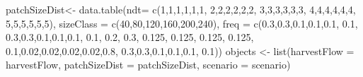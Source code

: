 \documentclass[
]{article}
\newenvironment{Shaded}{\begin{snugshade}}{\end{snugshade}}
\newcommand{\AttributeTok}[1]{\textcolor[rgb]{0.77,0.63,0.00}{#1}}
\newcommand{\DecValTok}[1]{\textcolor[rgb]{0.00,0.00,0.81}{#1}}
\newcommand{\FloatTok}[1]{\textcolor[rgb]{0.00,0.00,0.81}{#1}}
\newcommand{\FunctionTok}[1]{\textcolor[rgb]{0.00,0.00,0.00}{#1}}
\newcommand{\NormalTok}[1]{#1}
\newcommand{\OtherTok}[1]{\textcolor[rgb]{0.56,0.35,0.01}{#1}}
\begin{document}
\begin{Shaded}
\begin{Highlighting}[]
\NormalTok{patchSizeDist}\OtherTok{\textless{}{-}} \FunctionTok{data.table}\NormalTok{(}\AttributeTok{ndt=} \FunctionTok{c}\NormalTok{(}\DecValTok{1}\NormalTok{,}\DecValTok{1}\NormalTok{,}\DecValTok{1}\NormalTok{,}\DecValTok{1}\NormalTok{,}\DecValTok{1}\NormalTok{,}\DecValTok{1}\NormalTok{,}
                                  \DecValTok{2}\NormalTok{,}\DecValTok{2}\NormalTok{,}\DecValTok{2}\NormalTok{,}\DecValTok{2}\NormalTok{,}\DecValTok{2}\NormalTok{,}\DecValTok{2}\NormalTok{,}
                                  \DecValTok{3}\NormalTok{,}\DecValTok{3}\NormalTok{,}\DecValTok{3}\NormalTok{,}\DecValTok{3}\NormalTok{,}\DecValTok{3}\NormalTok{,}\DecValTok{3}\NormalTok{,}
                                  \DecValTok{4}\NormalTok{,}\DecValTok{4}\NormalTok{,}\DecValTok{4}\NormalTok{,}\DecValTok{4}\NormalTok{,}\DecValTok{4}\NormalTok{,}\DecValTok{4}\NormalTok{,}
                                  \DecValTok{5}\NormalTok{,}\DecValTok{5}\NormalTok{,}\DecValTok{5}\NormalTok{,}\DecValTok{5}\NormalTok{,}\DecValTok{5}\NormalTok{,}\DecValTok{5}\NormalTok{), }
                           \AttributeTok{sizeClass =} \FunctionTok{c}\NormalTok{(}\DecValTok{40}\NormalTok{,}\DecValTok{80}\NormalTok{,}\DecValTok{120}\NormalTok{,}\DecValTok{160}\NormalTok{,}\DecValTok{200}\NormalTok{,}\DecValTok{240}\NormalTok{), }
                           \AttributeTok{freq =} \FunctionTok{c}\NormalTok{(}\FloatTok{0.3}\NormalTok{,}\FloatTok{0.3}\NormalTok{,}\FloatTok{0.1}\NormalTok{,}\FloatTok{0.1}\NormalTok{,}\FloatTok{0.1}\NormalTok{, }\FloatTok{0.1}\NormalTok{,}
                                    \FloatTok{0.3}\NormalTok{,}\FloatTok{0.3}\NormalTok{,}\FloatTok{0.1}\NormalTok{,}\FloatTok{0.1}\NormalTok{,}\FloatTok{0.1}\NormalTok{, }\FloatTok{0.1}\NormalTok{,}
                                    \FloatTok{0.2}\NormalTok{, }\FloatTok{0.3}\NormalTok{, }\FloatTok{0.125}\NormalTok{, }\FloatTok{0.125}\NormalTok{, }\FloatTok{0.125}\NormalTok{, }\FloatTok{0.125}\NormalTok{,}
                                    \FloatTok{0.1}\NormalTok{,}\FloatTok{0.02}\NormalTok{,}\FloatTok{0.02}\NormalTok{,}\FloatTok{0.02}\NormalTok{,}\FloatTok{0.02}\NormalTok{,}\FloatTok{0.8}\NormalTok{,}
                                    \FloatTok{0.3}\NormalTok{,}\FloatTok{0.3}\NormalTok{,}\FloatTok{0.1}\NormalTok{,}\FloatTok{0.1}\NormalTok{,}\FloatTok{0.1}\NormalTok{, }\FloatTok{0.1}\NormalTok{))}
\NormalTok{objects }\OtherTok{\textless{}{-}} \FunctionTok{list}\NormalTok{(}\AttributeTok{harvestFlow =}\NormalTok{ harvestFlow, }
                \AttributeTok{patchSizeDist =}\NormalTok{ patchSizeDist, }
                \AttributeTok{scenario =}\NormalTok{ scenario)}

\end{Highlighting}
\end{Shaded}
\end{document}
